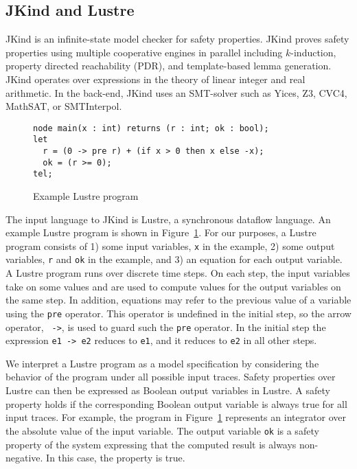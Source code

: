 \subsection{JKind and Lustre}
\label{subsec:jkind}

JKind is an infinite-state model checker for safety properties. JKind
proves safety properties using multiple cooperative engines in
parallel including $k$-induction, property directed reachability
(PDR), and template-based lemma generation. JKind operates over
expressions in the theory of linear integer and real arithmetic. In
the back-end, JKind uses an SMT-solver such as Yices, Z3, CVC4,
MathSAT, or SMTInterpol.

\begin{figure}[t]
\begin{verbatim}
node main(x : int) returns (r : int; ok : bool);
let
  r = (0 -> pre r) + (if x > 0 then x else -x);
  ok = (r >= 0);
tel;
\end{verbatim}
  \caption{Example Lustre program}
  \label{fig:lustre-ex}
\end{figure}

The input language to JKind is Lustre, a synchronous dataflow language.
An example Lustre program is shown in Figure~\ref{fig:lustre-ex}. For
our purposes, a Lustre program consists of 1) some input variables,
{\tt x} in the example, 2) some output variables, {\tt r} and {\tt ok}
in the example, and 3) an equation for each output variable. A Lustre
program runs over discrete time steps. On each step, the input
variables take on some values and are used to compute values for the
output variables on the same step. In addition, equations may refer to
the previous value of a variable using the {\tt pre} operator. This
operator is undefined in the initial step, so the arrow operator, {\tt
  ->}, is used to guard such the {\tt pre} operator. In the initial
step the expression {\tt e1 -> e2} reduces to {\tt e1}, and it
reduces to {\tt e2} in all other steps.

We interpret a Lustre program as a model specification by considering
the behavior of the program under all possible input traces. Safety
properties over Lustre can then be expressed as Boolean output
variables in Lustre. A safety property holds if the corresponding
Boolean output variable is always true for all input traces. For
example, the program in Figure~\ref{fig:lustre-ex} represents an
integrator over the absolute value of the input variable. The output
variable {\tt ok} is a safety property of the system expressing that
the computed result is always non-negative. In this case, the property
is true.

